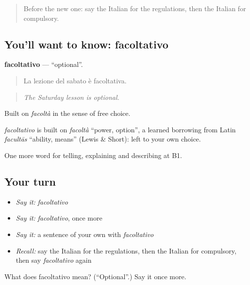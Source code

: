 \begin{quote}
Before the new one: say the Italian for the regulations, then the Italian for compulsory.
\end{quote}

\subsection*{You'll want to know: facoltativo}
\textbf{facoltativo} — \textquotedblleft{}optional\textquotedblright{}.

\begin{quote}
La lezione del sabato è facoltativa.
\end{quote}

\begin{quote}
\emph{The Saturday lesson is optional.}
\end{quote}

Built on \emph{facoltà} in the sense of free choice.

\begin{cousinweb}
\emph{facoltativo} is built on \emph{facoltà} \textquotedblleft{}power, option\textquotedblright{}, a learned borrowing from Latin \emph{facultās} \textquotedblleft{}ability, means\textquotedblright{} (Lewis \& Short): left to your own choice.
\end{cousinweb}

\begin{grammarlens}[title={What you've built}]
One more word for telling, explaining and describing at B1.
\end{grammarlens}

\subsection*{Your turn}
\begin{itemize}
\raggedright
  \item \emph{Say it:} \emph{facoltativo}
  \item \emph{Say it:} \emph{facoltativo}, once more
  \item \emph{Say it:} a sentence of your own with \emph{facoltativo}
  \item \emph{Recall:} say the Italian for the regulations, then the Italian for compulsory, then say \emph{facoltativo} again
\end{itemize}

\begin{tcolorbox}[breakable,colback=teal!4,colframe=teal!35!black,title={Before you move on}]
What does facoltativo mean? (\textquotedblleft{}Optional\textquotedblright{}.) Say it once more.
\end{tcolorbox}
